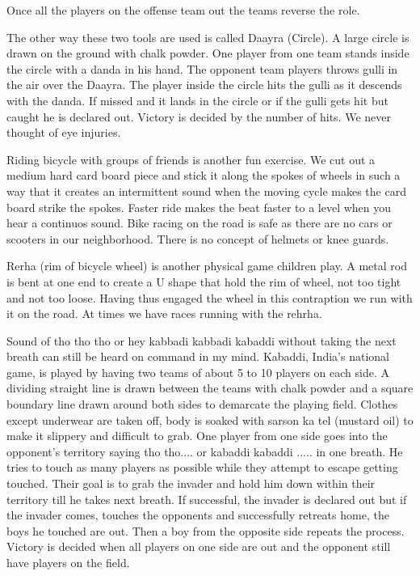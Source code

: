 Once all the players on the offense team out the teams reverse the role. 

The other way these two tools are used is called Daayra (Circle). A large
circle is drawn on the ground with chalk powder. One player from one team
stands inside the circle with a danda in his hand. The opponent team
players throws gulli in the air over the Daayra. The player inside the
circle hits the gulli as it descends with the danda. If missed and it
lands in the circle or if the gulli gets hit but caught he is declared
out. Victory is decided by the number of hits. We never thought of eye
injuries. 

Riding bicycle with groups of friends is another fun exercise. We cut out
a medium hard card board piece and stick it along the spokes of wheels in
such a way that it creates an intermittent sound when the moving cycle
makes the card board strike the spokes. Faster ride makes the beat faster
to a level when you hear a continuos sound. Bike racing on the road is
safe as there are no cars or scooters in our neighborhood. There is no
concept of helmets or knee guards. 

Rerha (rim of bicycle wheel) is another physical game children play.
A metal rod is bent at one end to create a U shape that hold the rim of
wheel, not too tight and not too loose. Having thus engaged the wheel in
this contraption we run with it on the road. At times we have races
running with the rehrha. 

Sound of tho tho tho or hey kabbadi kabbadi kabaddi without taking the
next breath can still be heard on command in my mind. Kabaddi, India's
national game, is played by having two teams of about 5 to 10 players on
each side. A dividing straight line is drawn between the teams with chalk
powder and a square boundary line drawn around both sides to demarcate the
playing field. Clothes except underwear are taken off, body is soaked with
sarson ka tel (mustard oil) to make it slippery and difficult to grab. One
player from one side goes into the opponent's territory saying tho tho....
or kabaddi  kabaddi ..... in one breath. He tries to touch as many players
as possible while they attempt to escape getting touched. Their goal is to
grab the invader and hold him down within their territory till he takes
next breath. If successful, the invader is declared out but if the invader
comes, touches the opponents and successfully retreats home, the boys he
touched are out. Then a boy from the opposite side repeats the process.
Victory is decided when all players on one side are out and the opponent
still have players on the field. 

